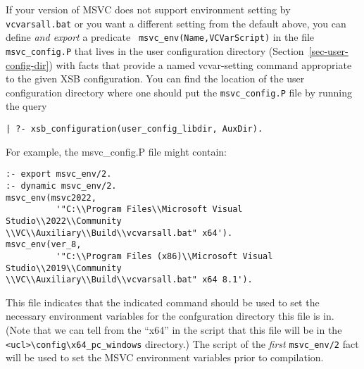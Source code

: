 If your version of MSVC does not support environment setting by {\tt
  vcvarsall.bat} or you want a different setting from the default
above, you can define {\em and export} a predicate {\tt
  msvc\_env(Name,VCVarScript)} in the file \texttt{msvc\_config.P}
that lives in the user configuration directory
(Section~\ref{sec-user-config-dir}) with facts that provide a named
vcvar-setting command appropriate to the given XSB configuration.  You
can find the location of the user configuration directory where one
should put the {\tt msvc\_config.P} file by running the query
\begin{verbatim}
| ?- xsb_configuration(user_config_libdir, AuxDir).
\end{verbatim}
For example, the msvc\_config.P file might contain:
\begin{verbatim}
:- export msvc_env/2.
:- dynamic msvc_env/2.
msvc_env(msvc2022,
          '"C:\\Program Files\\Microsoft Visual Studio\\2022\\Community
\\VC\\Auxiliary\\Build\\vcvarsall.bat" x64').
msvc_env(ver_8,
          '"C:\\Program Files (x86)\\Microsoft Visual Studio\\2019\\Community
\\VC\\Auxiliary\\Build\\vcvarsall.bat" x64 8.1').
\end{verbatim}
This file indicates that the indicated command should be used to set
the necessary environment variables for the confguration directory
this file is in.  (Note that we can tell from the ``x64'' in the
script that this file will be in the
\verb|<ucl>\config\x64_pc_windows| directory.)  The script of the {\em
  first} {\tt msvc\_env/2} fact will be used to set the MSVC
environment variables prior to compilation.


